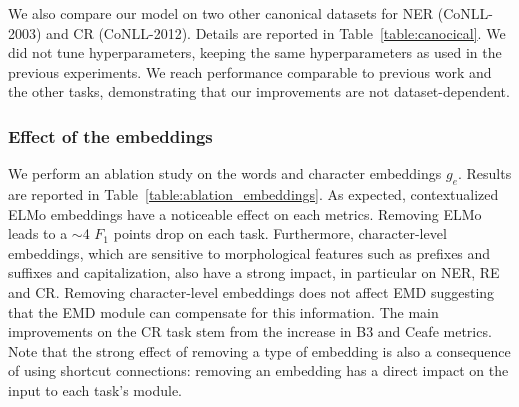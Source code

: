 \documentclass[letterpaper]{article} %
\begin{document}
We also compare our model on two other canonical datasets for NER (CoNLL-2003) and CR (CoNLL-2012). Details are reported in Table~\ref{table:canocical}. We did not tune hyperparameters, keeping the same hyperparameters as used in the previous experiments. We reach performance comparable to previous work and the other tasks, demonstrating that our improvements are not dataset-dependent.

\begin{table}
\centering
\caption{Comparison to other canonical datasets on NER (CoNLL-2003) and coreference (CoNLL-2012). A-CoNLL: train A-RS-GM using CoNLL-2003 for NER; A-CoNLL-2012: train A using CoNLL-2012 for coreference.}
\label{table:canocical}
\end{table}


\subsubsection*{Effect of the embeddings}

We perform an ablation study on the words and character embeddings $g_{e}$. Results are reported in Table~\ref{table:ablation_embeddings}. As expected, contextualized ELMo embeddings have a noticeable effect on each metrics. Removing ELMo leads to a $\sim$4 $F_{1}$ points drop on each task. Furthermore, character-level embeddings, which are sensitive to morphological features such as prefixes and suffixes and capitalization, also have a strong impact, in particular on NER, RE and CR. Removing character-level embeddings does not affect EMD suggesting that the EMD module can compensate for this information. The main improvements on the CR task stem from the increase in B3 and Ceafe metrics. Note that the strong effect of removing a type of embedding is also a consequence of using shortcut connections: removing an embedding has a direct impact on the input to each task's module.
\end{document}
